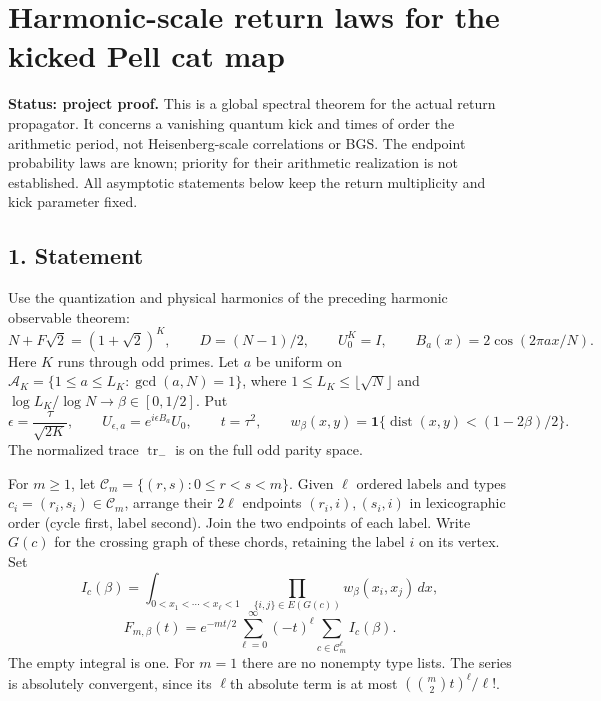 \hypertarget{harmonic-returns-harmonic-scale-return-laws-for-the-kicked-pell-cat-map}{%
\section{Harmonic-scale return laws for the kicked Pell cat map}\label{harmonic-returns-harmonic-scale-return-laws-for-the-kicked-pell-cat-map}}

\textbf{Status: project proof.} This is a global spectral theorem for the actual
return propagator. It concerns a vanishing quantum kick and times of order
the arithmetic period, not Heisenberg-scale correlations or BGS. The endpoint
probability laws are known; priority for their arithmetic realization is not
established. All asymptotic statements below keep the return multiplicity
and kick parameter fixed.

\hypertarget{harmonic-returns-statement}{%
\subsection{1. Statement}\label{harmonic-returns-statement}}

Use the quantization and physical harmonics of
the preceding harmonic observable theorem:
\[
 N+F\sqrt2=(1+\sqrt2)^K,\qquad D=(N-1)/2,\qquad U_0^K=I,
 \qquad B_a(x)=2\cos(2\pi ax/N).
\]
Here \(K\) runs through odd primes. Let \(a\) be uniform on
\(\mathcal A_K=\{1\le a\le L_K:\gcd(a,N)=1\}\), where
\(1\le L_K\le\lfloor\sqrt N\rfloor\) and
\(\log L_K/\log N\to\beta\in[0,1/2]\). Put
\[
 \epsilon=\frac{\tau}{\sqrt{2K}},\qquad
 U_{\epsilon,a}=e^{i\epsilon B_a}U_0,\qquad t=\tau^2,\qquad
 w_\beta(x,y)=\mathbf1\{\operatorname{dist}(x,y)<(1-2\beta)/2\}.
                                                               \tag{R1}
\]
The normalized trace \(\operatorname{tr}_-\) is on the full odd parity space.

For \(m\ge1\), let \(\mathcal C_m=\{(r,s):0\le r<s<m\}\).
Given \(\ell\) ordered labels and types
\(c_i=(r_i,s_i)\in\mathcal C_m\), arrange their \(2\ell\) endpoints
\((r_i,i),(s_i,i)\) in lexicographic order (cycle first, label second).
Join the two endpoints of each label. Write \(G(c)\) for the crossing graph
of these chords, retaining the label \(i\) on its vertex. Set
\[
 I_c(\beta)=\int_{0<x_1<\cdots<x_\ell<1}
                  \prod_{\{i,j\}\in E(G(c))}w_\beta(x_i,x_j)\,dx,
\]
\[
 F_{m,\beta}(t)=e^{-mt/2}\sum_{\ell=0}^\infty(-t)^\ell
                  \sum_{c\in\mathcal C_m^\ell} I_c(\beta).       \tag{R2}
\]
The empty integral is one. For \(m=1\) there are no nonempty type lists.
The series is absolutely convergent, since its \(\ell\)th absolute term is
at most \((\binom m2 t)^\ell/\ell!\).

